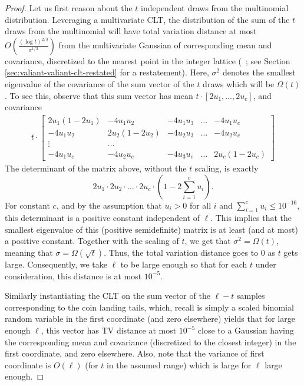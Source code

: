 \documentclass[10pt]{article} %
\theoremstyle{plain}
\begin{document}
\begin{proof}
	Let us first reason about the $t$ independent draws from the multinomial distribution. Leveraging a multivariate CLT, the distribution of the sum of the $t$ draws from the multinomial will have total variation distance at most $O\left(\frac{(\log t)^{2/3}}{\sigma^{1/3}}\right)$ from the multivariate Gaussian of corresponding mean and covariance, discretized to the nearest point in the integer lattice (~\citep[Theorem 4]{valiant2011estimating}; see Section \ref{sec:valiant-valiant-clt-restated} for a restatement). Here, $\sigma^2$ denotes the smallest eigenvalue of the covariance of the sum vector of the $t$ draws which will be $\Omega(t)$. To see this, observe that this sum vector has mean $t \cdot [2u_1,\ldots,2u_c]$, and covariance
	\begin{align*}
		t \cdot \begin{bmatrix}
			2u_1(1-2u_1) & -4u_1u_2 & -4u_1u_3 & \dots & -4u_1u_c \\
			-4u_1u_2 & 2u_2(1-2u_2) & -4u_2u_3 & \dots & -4u_2u_c \\
			\vdots & \dots\\
			-4u_1u_c & -4u_2u_c & -4u_3u_c & \dots & 2u_c(1-2u_c)
		\end{bmatrix}
	\end{align*}
	The determinant of the matrix above, without the $t$ scaling, is exactly $$2u_1\cdot2u_2\cdot\dots\cdot2u_c\cdot\left(1-2\sum_{i=1}^cu_i\right).$$
	For constant $c$, and by the assumption that $u_i > 0$ for all $i$ and $\sum_{i=1}^cu_i \le 10^{-16}$, this determinant is a positive constant independent of $\ell$. This implies that the smallest eigenvalue of this (positive semidefinite) matrix is at least (and at most) a positive constant. Together with the scaling of $t$, we get that $\sigma^2 = \Omega(t)$, meaning that $\sigma=\Omega(\sqrt{t})$. Thus, the total variation distance goes to $0$ as $t$ gets large. Consequently, we take $\ell$ to be large enough so that for each $t$ under consideration, this distance is at most $10^{-5}$.
	
	Similarly instantiating the CLT on the sum vector of the $\ell-t$ samples corresponding to the coin landing tails, which, recall is simply a scaled binomial random variable in the first coordinate (and zero elsewhere) yields that for large enough $\ell$, this vector has TV distance at most $10^{-5}$ close to a Gaussian having the corresponding mean and covariance (discretized to the closest integer) in the first coordinate, and zero elsewhere. Also, note that the variance of first coordinate is $O(\ell)$ (for $t$ in the assumed range) which is large for $\ell$ large enough.
	

\end{proof}
\end{document}
